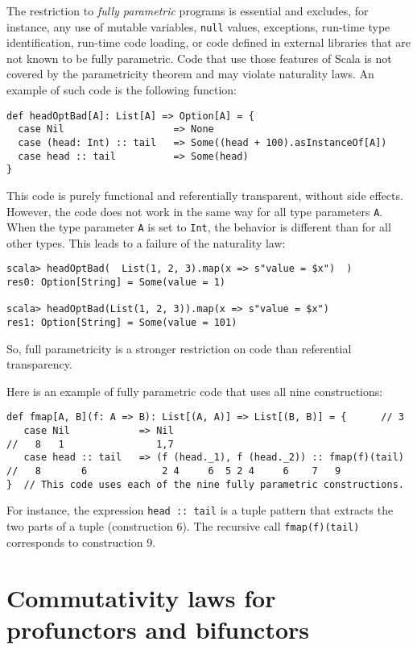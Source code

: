 The restriction to \emph{fully parametric} programs
is essential and excludes, for instance, any use of mutable variables,
\lstinline!null! values, exceptions, run-time type identification,
run-time code loading, or code defined in external libraries that
are not known to be fully parametric. Code that use those features
of Scala is not covered by the parametricity theorem and may violate
naturality laws. An example of such code is the following function:
\begin{lstlisting}
def headOptBad[A]: List[A] => Option[A] = {
  case Nil                   => None
  case (head: Int) :: tail   => Some((head + 100).asInstanceOf[A])
  case head :: tail          => Some(head)
}
\end{lstlisting}
This code is purely functional and referentially
transparent, without side effects. However, the code does not work
in the same way for all type parameters \lstinline!A!. When the type
parameter \lstinline!A! is set to \lstinline!Int!, the behavior
is different than for all other types. This leads to a failure of
the naturality law:
\begin{lstlisting}
scala> headOptBad(  List(1, 2, 3).map(x => s"value = $x")  )
res0: Option[String] = Some(value = 1)

scala> headOptBad(List(1, 2, 3)).map(x => s"value = $x")
res1: Option[String] = Some(value = 101)
\end{lstlisting}
So, full parametricity is a stronger restriction on code than referential
transparency.

Here is an example of fully parametric code that uses all nine constructions:
\begin{lstlisting}
def fmap[A, B](f: A => B): List[(A, A)] => List[(B, B)] = {      // 3
   case Nil            => Nil
//   8   1                1,7 
   case head :: tail   => (f (head._1), f (head._2)) :: fmap(f)(tail)
//   8       6             2 4     6  5 2 4     6    7   9
}  // This code uses each of the nine fully parametric constructions.
\end{lstlisting}
For instance, the expression \lstinline!head :: tail! is a tuple
pattern that extracts the two parts of a tuple (construction 6). The
recursive call \lstinline!fmap(f)(tail)! corresponds to construction
9.

\section{Commutativity laws for profunctors and bifunctors\label{sec:Commutativity-laws-for-type-constructors}}

